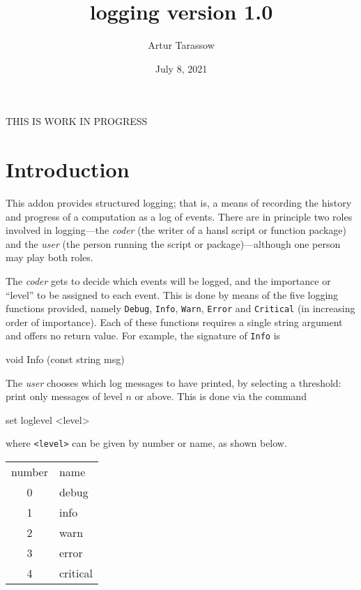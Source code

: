 \documentclass{article}
\begin{document}
\setlength{\parindent}{0pt}
\setlength{\parskip}{1ex}

\newcommand{\argname}[1]{\textsl{#1}}

\title{logging version 1.0}
\author{Artur Tarassow}
\date{July 8, 2021}
\maketitle

THIS IS WORK IN PROGRESS

\section{Introduction}

This addon provides structured logging; that is, a means of recording
the history and progress of a computation as a log of events. There
are in principle two roles involved in logging---the \textit{coder}
(the writer of a hansl script or function package) and the
\textit{user} (the person running the script or package)---although
one person may play both roles.

The \textit{coder} gets to decide which events will be logged, and the
importance or ``level'' to be assigned to each event. This is done by
means of the five logging functions provided, namely \texttt{Debug},
\texttt{Info}, \texttt{Warn}, \texttt{Error} and \texttt{Critical} (in
increasing order of importance).  Each of these functions requires a
single string argument and offers no return value. For example, the
signature of \texttt{Info} is
\begin{code}
void Info (const string msg)
\end{code}

The \textit{user} chooses which log messages to have printed, by
selecting a threshold: print only messages of level $n$ or above.
This is done via the command
\begin{code}
set loglevel <level>
\end{code}
where \verb|<level>| can be given by number or name, as shown below.

\begin{center}
  \begin{tabular}{cl}
    number & name \\[4pt]
    0 & debug \\
    1 & info \\
    2 & warn \\
    3 & error \\
    4 & critical
  \end{tabular}
\end{center}
\end{document}

